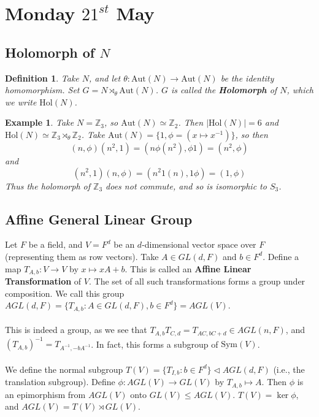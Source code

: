 \documentclass[a4paper,10pt]{article}
\newcommand{\ZZ}{\mathbb{Z}}
\newtheorem{Def}[thm]{Definition}
\newtheorem{eg}[thm]{Example}
\begin{document}
\newpage
\section{Monday $21^{st}$ May}

\subsection{Holomorph of $N$}
\begin{Def}
Take $N$, and let $\theta: \text{Aut}(N) \rightarrow \text{Aut}(N)$ be the identity homomorphism. Set $G = N \rtimes_\theta \text{Aut}(N)$. $G$ is called the \textbf{Holomorph} of $N$, which we write $\text{Hol}(N)$. 
\end{Def}

\begin{eg}
Take $N = \ZZ_3$, so $\text{Aut}(N) \simeq \ZZ_2$. Then $|\text{Hol}(N)| = 6$ and $\text{Hol}(N) \simeq \ZZ_3 \rtimes_\theta \ZZ_2$. Take $\text{Aut}(N) = \{ 1, \phi = (x \mapsto x^{-1}) \}$, so then
\[ (n, \phi) (n^2, 1) = ( n \phi (n^2), \phi 1) = (n^2, \phi) \]
and
\[ (n^2, 1)(n, \phi) = (n^2 1(n), 1 \phi) = (1, \phi) \]
Thus the holomorph of $\ZZ_3$ does not commute, and so is isomorphic to $S_3$. 
\end{eg}


\subsection{Affine General Linear Group}

Let $F$ be a field, and $V = F^d$ be an $d$-dimensional vector space over $F$ (representing them as row vectors). Take $A \in GL(d,F)$ and $b \in F^d$. Define a map $T_{A,b} : V \rightarrow V$ by $x \mapsto xA + b$. This is called an \textbf{Affine Linear Transformation} of $V$. The set of all such transformations forms a group under composition. We call this group $AGL(d,F) = \{ T_{A,b} : A \in GL(d,F), b \in F^d \} = AGL(V)$. \\
\\
This is indeed a group, as we see that $T_{A,b} T_{C,d} = T_{AC, bC + d} \in AGL(n,F)$, and $(T_{A,b})^{-1} = T_{A^{-1}, -bA^{-1}}$. In fact, this forms a subgroup of $\text{Sym}(V)$. \\
\\
We define the normal subgroup $T(V) = \{ T_{I,b} : b \in F^d \} \triangleleft AGL(d,F)$ (i.e., the translation subgroup). Define $\phi : AGL(V) \rightarrow GL(V)$ by $T_{A,b} \mapsto A$. Then $\phi$ is an epimorphism from $AGL(V)$ onto $GL(V) \leq AGL(V)$. $T(V) = \ker \phi$, and $AGL(V) = T(V) \rtimes GL(V)$. 
\end{document}
